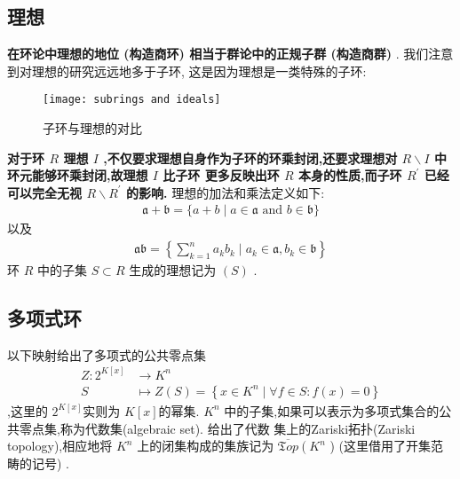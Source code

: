 \subsection{理想}
\textbf{在环论中理想的地位 (构造商环) 相当于群论中的正规子群 (构造商群)} . 我们注意到对理想的研究远远地多于子环, 这是因为理想是一类特殊的子环:
\begin{figure}[htbp]
  \small
  \centering
  \texttt{[image: subrings and ideals]}
  \caption{子环与理想的对比}
  \label{fig: the difference between subring and ideal}
\end{figure}

\textbf{对于环 $R$ 理想 $I$ ,不仅要求理想自身作为子环的环乘封闭,还要求理想对 $R \backslash I$ 中环元能够环乘封闭,故理想 $I$ 比子环 更多反映出环 $R$ 本身的性质,而子环 $R^{\prime}$ 已经可以完全无视 $R \backslash R^{\prime}$ 的影响.}
理想的加法和乘法定义如下:
\begin{align*}
\mathfrak{a}+\mathfrak{b}=\{a+b \mid a \in \mathfrak{a} \text { and } b \in \mathfrak{b}\}
\end{align*}
以及
\begin{align*}
\mathfrak{a} \mathfrak{b}=\left\{\sum_{k=1}^n a_k b_k \mid a_k \in \mathfrak{a}, b_k \in \mathfrak{b}\right\}
\end{align*}
环 $R$ 中的子集 $S \subset R$ 生成的理想记为 $(S)$ .

\subsection{多项式环}

以下映射给出了多项式的公共零点集
\begin{equation}\label{eq:zero set1}
\begin{aligned}
Z: 2^{K[x]} & \rightarrow K^n \\
S & \mapsto Z(S)=\left\{x \in K^n \mid \forall f \in S: f(x)=0\right\}
\end{aligned}
\end{equation}
,这里的 $2^{K[x]}$实则为 $K[x]$的幂集.
$K^n$ 中的子集,如果可以表示为多项式集合的公共零点集,称为代数集(algebraic set). \cite{hartshorne2013algebraic}  给出了代数 集上的Zariski拓扑(Zariski topology),相应地将 $K^n$ 上的闭集构成的集族记为 $\overline{\mathfrak{T} o p}\left(K^n\right.$ ) (这里借用了开集范畴的记号) .

